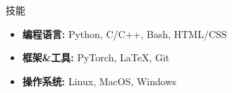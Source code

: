 \documentclass[a4paper]{resume} %
\begin{document}







\begin{rSection}{技能}

\begin{itemize}
    \item {\bf 编程语言:} Python, C/C++, Bash, HTML/CSS
    \item {\bf 框架\&工具:} PyTorch, \LaTeX, Git
    \item {\bf 操作系统:} Linux, MacOS, Windows
\end{itemize}

\end{rSection}
\end{document}
